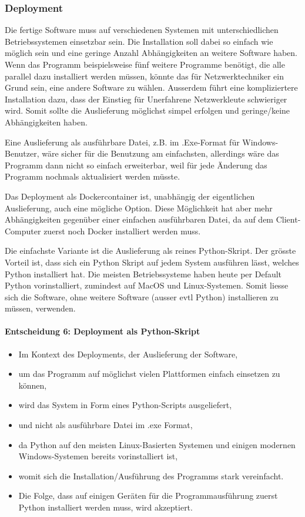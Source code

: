 \documentclass[]{subfiles}
\begin{document}
		\subsubsection{Deployment}
		Die fertige Software muss auf verschiedenen Systemen mit unterschiedlichen Betriebssystemen einsetzbar sein.
		Die Installation soll dabei so einfach wie möglich sein und eine geringe Anzahl Abhängigkeiten an weitere Software haben.
		Wenn das Programm beispielsweise fünf weitere Programme benötigt, die alle parallel dazu installiert werden müssen, könnte das für Netzwerktechniker ein Grund sein, eine andere Software zu wählen.
		Ausserdem führt eine kompliziertere Installation dazu, dass der Einstieg für Unerfahrene Netzwerkleute schwieriger wird.
		Somit sollte die Auslieferung möglichst simpel erfolgen und geringe/keine Abhängigkeiten haben.
		
		Eine Auslieferung als ausführbare Datei, z.B. im .Exe-Format für Windows-Benutzer, wäre sicher für die Benutzung am einfachsten,
		allerdings wäre das Programm dann nicht so einfach erweiterbar, weil für jede Änderung das Programm nochmals aktualisiert werden müsste.

		Das Deployment als Dockercontainer ist, unabhängig der eigentlichen Auslieferung, auch eine mögliche Option.
		Diese Möglichkeit hat aber mehr Abhängigkeiten gegenüber einer einfachen ausführbaren Datei, da auf dem Client-Computer zuerst noch Docker installiert werden muss.
		
		Die einfachste Variante ist die Auslieferung als reines Python-Skript. Der grösste Vorteil ist, dass sich ein Python Skript auf jedem System ausführen lässt, welches Python installiert hat.
		Die meisten Betriebssysteme haben heute per Default Python vorinstalliert, zumindest auf MacOS und Linux-Systemen.
		Somit liesse sich die Software, ohne weitere Software (ausser evtl Python) installieren zu müssen, verwenden.

		\paragraph{Entscheidung 6: Deployment als Python-Skript}
		\begin{itemize}
			\item Im Kontext des Deployments, der Auslieferung der Software,
			\item um das Programm auf möglichst vielen Plattformen einfach einsetzen zu können,
			\item wird das System in Form eines Python-Scripts ausgeliefert,
			\item und nicht als ausführbare Datei im .exe Format,
			\item da Python auf den meisten Linux-Basierten Systemen und einigen modernen Windows-Systemen bereits vorinstalliert ist,
			\item womit sich die Installation/Ausführung des Programms stark vereinfacht.
			\item Die Folge, dass auf einigen Geräten für die Programmausführung zuerst Python installiert werden muss, wird akzeptiert.
		\end{itemize}
\end{document}
